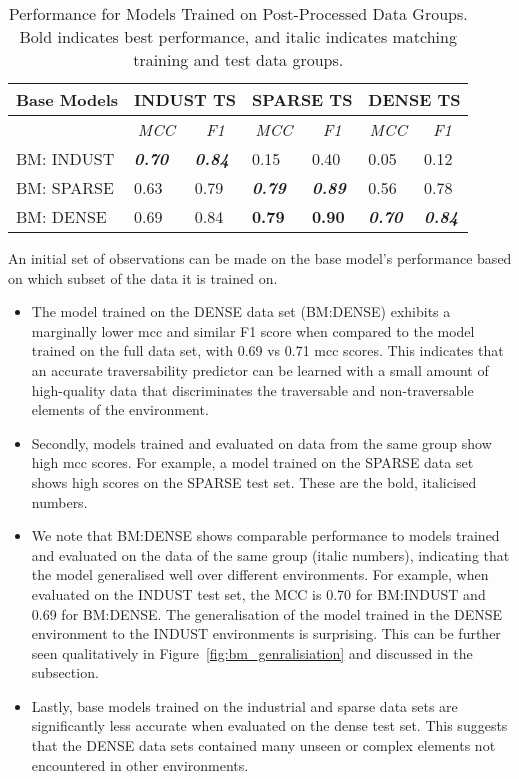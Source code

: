 \begin{table}[h!]
\centering
\caption{Performance for Models Trained on Post-Processed Data Groups. Bold indicates best performance, and italic indicates matching training and test data groups.}
\label{tab:offline_base}
\begin{tabular}{@{}lllllll@{}}
\hline
\multicolumn{1}{l}{Base Models} & \multicolumn{2}{l}{ INDUST TS} & \multicolumn{2}{l}{SPARSE TS} & \multicolumn{2}{l}{DENSE TS} \\ \midrule
  & \multicolumn{1}{c}{{\color[HTML]{656565} \textit{MCC}}} & \multicolumn{1}{c}{{\color[HTML]{656565} \textit{F1}}} & \multicolumn{1}{c}{{\color[HTML]{656565} \textit{MCC}}} & \multicolumn{1}{c}{{\color[HTML]{656565} \textit{F1}}} & \multicolumn{1}{c}{{\color[HTML]{656565} \textit{MCC}}} & \multicolumn{1}{c}{{\color[HTML]{656565} \textit{F1}}} \\ \midrule
BM: INDUST &  \textbf{\emph{0.70}}  & \textbf{\emph{0.84}}  & 0.15  & 0.40 & 0.05 &0.12\\
BM: SPARSE & 0.63  &  0.79  &  \textbf{\emph{0.79}}  & \textbf{\emph{0.89}} & 0.56  & 0.78 \\
BM: DENSE & 0.69   &  0.84 & \textbf{0.79} &  \textbf{0.90} & \textbf{\emph{0.70}}  &  \textbf{\emph{0.84}} \\ \bottomrule
\end{tabular}%
\end{table}

An initial set of observations can be made on the base model's performance based on which subset of the data it is trained on.
\begin{itemize}
 \item The model trained on the DENSE data set (BM:DENSE) exhibits a marginally lower \ac{mcc} and similar F1 score when compared to the model trained on the full data set, with 0.69 vs 0.71 \ac{mcc} scores. This indicates that an accurate traversability predictor can be learned with a small amount of high-quality data that discriminates the traversable and non-traversable elements of the environment.
\item Secondly, models trained and evaluated on data from the same group show high \ac{mcc} scores. For example, a model trained on the SPARSE data set shows high scores on the SPARSE test set. These are the bold, italicised numbers.
\item We note that BM:DENSE shows comparable performance to models trained and evaluated on the data of the same group (italic numbers), indicating that the model generalised well over different environments. For example, when evaluated on the INDUST test set, the MCC is 0.70 for BM:INDUST and 0.69 for BM:DENSE. The generalisation of the model trained in the DENSE environment to the INDUST environments is surprising. This can be further seen qualitatively in Figure~\ref{fig:bm_genralisiation} and discussed in the subsection.
\item Lastly, base models trained on the industrial and sparse data sets are significantly less accurate when evaluated on the dense test set. This suggests that the DENSE data sets contained many unseen or complex elements not encountered in other environments. 
\end{itemize}

